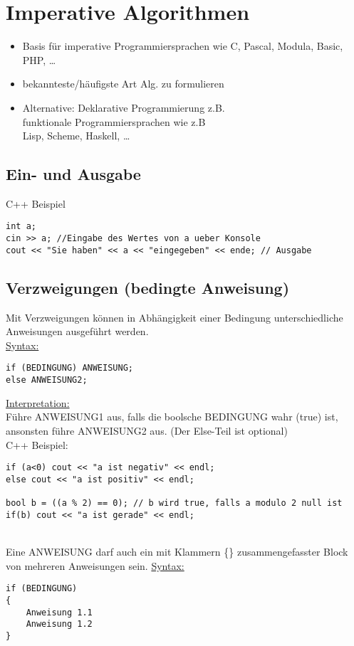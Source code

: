 \section{Imperative Algorithmen}
\begin{itemize}
 \item Basis für imperative Programmiersprachen wie C, Pascal, Modula, Basic, PHP, \dots
 \item bekannteste/häufigste Art Alg. zu formulieren
 \item Alternative: Deklarative Programmierung z.B. \\
 funktionale Programmiersprachen wie z.B \\
 Lisp, Scheme, Haskell, \dots
\end{itemize}

\subsection{Ein- und Ausgabe}
 C++ Beispiel
 \begin{lstlisting}
int a;
cin >> a; //Eingabe des Wertes von a ueber Konsole
cout << "Sie haben" << a << "eingegeben" << ende; // Ausgabe
 \end{lstlisting}

\subsection{Verzweigungen (bedingte Anweisung)}
Mit Verzweigungen können in Abhängigkeit einer Bedingung unterschiedliche Anweisungen ausgeführt werden. \\
\underline{Syntax:} \\
\begin{lstlisting}
if (BEDINGUNG) ANWEISUNG;
else ANWEISUNG2;
\end{lstlisting}
\underline{Interpretation:} \\
Führe ANWEISUNG1 aus, falls die boolsche BEDINGUNG wahr (true) ist, ansonsten führe ANWEISUNG2 aus. (Der Else-Teil ist optional) \\
C++ Beispiel:
\begin{lstlisting}
if (a<0) cout << "a ist negativ" << endl;
else cout << "a ist positiv" << endl;

bool b = ((a % 2) == 0); // b wird true, falls a modulo 2 null ist
if(b) cout << "a ist gerade" << endl;
\end{lstlisting}

~\\ 
Eine ANWEISUNG darf auch ein mit Klammern \{\} zusammengefasster Block von mehreren Anweisungen sein.
\newpage
\underline{Syntax:} \\
\begin{lstlisting}
if (BEDINGUNG)
{
	Anweisung 1.1
	Anweisung 1.2
}
\end{lstlisting}

